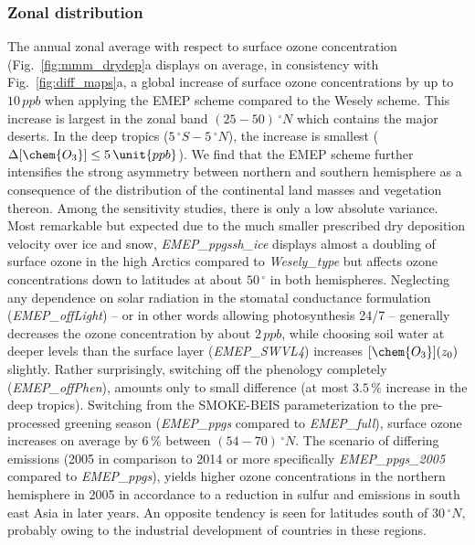 \documentclass[gmd, manuscript]{copernicus}
\begin{document}
\subsubsection{Zonal distribution}
\label{subsubsec:zonal}
%
The annual zonal average with respect to surface ozone concentration (Fig.~\ref{fig:mmm_drydep}a displays on average, in consistency with Fig.~\ref{fig:diff_maps}a, a global increase of surface ozone concentrations by up to $10\,\unit{ppb}$ when applying the EMEP scheme compared to the Wesely scheme. This increase is largest in the zonal band $(25-50)\,\unit{^\circ N}$ which contains the major deserts. In the deep tropics ($5\,\unit{^\circ S}-5\,\unit{^\circ N}$), the increase is smallest ($\Delta[\chem{O_3}]\leq 5\,\unit{ppb}$). We find that the EMEP scheme further intensifies the strong asymmetry between northern and southern hemisphere as a consequence of the distribution of the continental land masses and vegetation thereon. Among the sensitivity studies, there is only a low absolute variance. Most remarkable but expected due to the much smaller prescribed dry deposition velocity over ice and snow, \emph{EMEP\_ppgssh\_ice} displays almost a doubling of surface ozone in the high Arctics compared to \emph{Wesely\_type} but affects ozone concentrations down to latitudes at about $50\,\unit{^\circ}$ in both hemispheres. Neglecting any dependence on solar radiation in the stomatal conductance formulation (\emph{EMEP\_offLight}) -- or in other words allowing photosynthesis 24/7 -- generally decreases the ozone concentration by about $2\,\unit{ppb}$, while choosing soil water at deeper levels than the surface layer (\emph{EMEP\_SWVL4}) increases $[\chem{O_3}](z_0)$ slightly. Rather surprisingly, switching off the phenology completely (\emph{EMEP\_offPhen}), amounts only to small difference (at most $3.5\,\unit{\%}$ increase in the deep tropics). Switching from the SMOKE-BEIS parameterization to the pre-processed greening season (\emph{EMEP\_ppgs} compared to \emph{EMEP\_full}), surface ozone increases on average by $6\,\unit{\%}$ between $(54-70)\,\unit{^\circ N}$. The scenario of differing emissions (2005 in comparison to 2014 or more specifically \emph{EMEP\_ppgs\_2005} compared to \emph{EMEP\_ppgs}), yields higher ozone concentrations in the northern hemisphere in 2005 in accordance to a reduction in sulfur and  emissions in south east Asia in later years. An opposite tendency is seen for latitudes south of $30\,\unit{^\circ N}$, probably owing to the industrial development of countries in these regions. 
\end{document}
